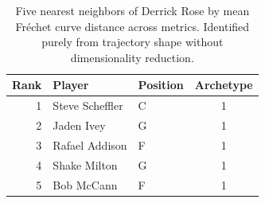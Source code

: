 \begin{table}[htbp]
  \centering\small
  \begin{tabular}{rllc}
    \toprule
    Rank & Player & Position & Archetype \\
    \midrule
    1 & Steve Scheffler & C & 1 \\
    2 & Jaden Ivey & G & 1 \\
    3 & Rafael Addison & F & 1 \\
    4 & Shake Milton & G & 1 \\
    5 & Bob McCann & F & 1 \\
    \bottomrule
  \end{tabular}
  \caption{Five nearest neighbors of Derrick Rose by mean Fr\'{e}chet curve distance across metrics. Identified purely from trajectory shape without dimensionality reduction.}
  \label{tab:Derrick_Rose_frechet_curve_neighbors}
\end{table}

